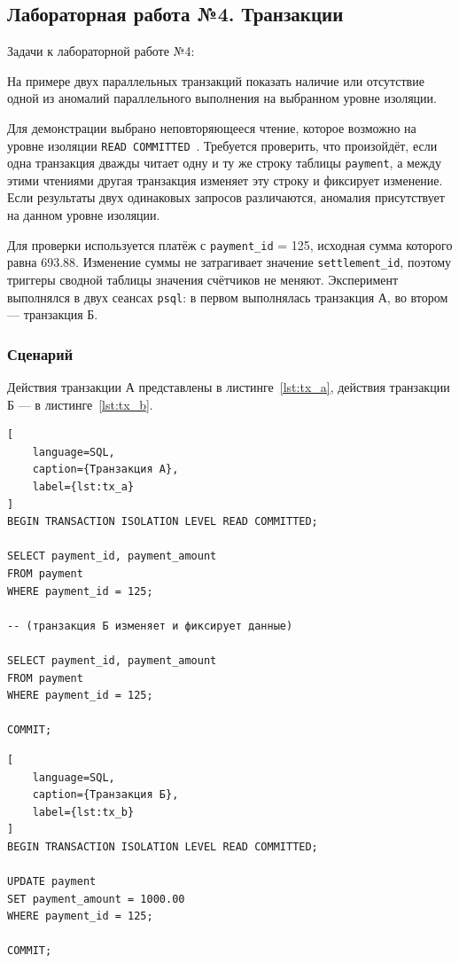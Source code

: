 \newpage
\subsection{Лабораторная работа №4. Транзакции}
Задачи к лабораторной работе №4:

На примере двух параллельных транзакций показать наличие или отсутствие одной из аномалий параллельного выполнения на выбранном уровне изоляции.

Для демонстрации выбрано неповторяющееся чтение, которое возможно на уровне изоляции \texttt{READ COMMITTED}~\cite{pg-isolation}. Требуется проверить, что произойдёт, если одна транзакция дважды читает одну и ту же строку таблицы \texttt{payment}, а между этими чтениями другая транзакция изменяет эту строку и фиксирует изменение. Если результаты двух одинаковых запросов различаются, аномалия присутствует на данном уровне изоляции.

Для проверки используется платёж с \texttt{payment\_id} = 125, исходная сумма которого равна 693.88. Изменение суммы не затрагивает значение \texttt{settlement\_id}, поэтому триггеры сводной таблицы значения счётчиков не меняют. Эксперимент выполнялся в двух сеансах \texttt{psql}: в первом выполнялась транзакция А, во втором --- транзакция Б.

\subsubsection{Сценарий}

Действия транзакции А представлены в листинге~\ref{lst:tx_a}, действия транзакции Б --- в листинге~\ref{lst:tx_b}.

\begin{lstlisting}[
    language=SQL,
    caption={Транзакция А},
    label={lst:tx_a}
]
BEGIN TRANSACTION ISOLATION LEVEL READ COMMITTED;

SELECT payment_id, payment_amount
FROM payment
WHERE payment_id = 125;

-- (транзакция Б изменяет и фиксирует данные)

SELECT payment_id, payment_amount
FROM payment
WHERE payment_id = 125;

COMMIT;
\end{lstlisting}

\begin{lstlisting}[
    language=SQL,
    caption={Транзакция Б},
    label={lst:tx_b}
]
BEGIN TRANSACTION ISOLATION LEVEL READ COMMITTED;

UPDATE payment
SET payment_amount = 1000.00
WHERE payment_id = 125;

COMMIT;
\end{lstlisting}

